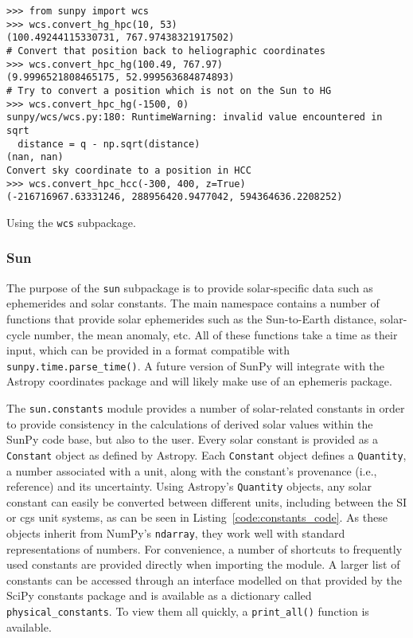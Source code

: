 \begin{listing}[H]
\begin{verbatim}
>>> from sunpy import wcs
>>> wcs.convert_hg_hpc(10, 53)
(100.49244115330731, 767.97438321917502)
# Convert that position back to heliographic coordinates
>>> wcs.convert_hpc_hg(100.49, 767.97)
(9.9996521808465175, 52.999563684874893)
# Try to convert a position which is not on the Sun to HG
>>> wcs.convert_hpc_hg(-1500, 0)
sunpy/wcs/wcs.py:180: RuntimeWarning: invalid value encountered in sqrt
  distance = q - np.sqrt(distance)
(nan, nan)
Convert sky coordinate to a position in HCC
>>> wcs.convert_hpc_hcc(-300, 400, z=True)
(-216716967.63331246, 288956420.9477042, 594364636.2208252)
\end{verbatim}
\caption{Using the \texttt{wcs} subpackage.}
\label{code:wcs_code}
\end{listing}

\subsubsection{Sun}\label{ssec:util:sun}
The purpose of the \texttt{sun} subpackage is to provide solar-specific data such as ephemerides and
solar constants. The main namespace contains a number of functions that provide solar
ephemerides such as the Sun-to-Earth distance, solar-cycle number, the mean 
anomaly, etc.
All of these functions take a time as their input, which can be provided in a format
compatible with \texttt{sunpy.time.parse\_time()}. 
A future version of SunPy will integrate with the Astropy coordinates package and will 
likely make use of an ephemeris package.

The \texttt{sun.constants} module provides a number of solar-related 
constants in order to provide consistency in the calculations of derived solar 
values  within the SunPy code base, but also to the user. Every solar 
constant is provided as a \texttt{Constant} object as defined by Astropy. Each 
\texttt{Constant} object defines a \texttt{Quantity}, a number associated with a unit, along with 
the constant's provenance (i.e., reference) and its uncertainty. Using 
Astropy's \texttt{Quantity} objects, any solar constant can easily be converted between 
different units, including between the SI or cgs unit systems, as can be seen in Listing~\ref{code:constants_code}.
As these objects inherit from 
NumPy's \texttt{ndarray}, they work well with standard representations of numbers.
For convenience, a number of shortcuts to frequently used constants are provided 
directly when importing the module. A larger list of constants can be 
accessed through an interface modelled on that provided by the SciPy constants 
package and is available as a dictionary called \texttt{physical\_constants}. 
To view them all quickly, a \texttt{print\_all()} function is available.


